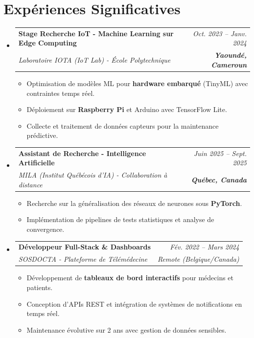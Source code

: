 \documentclass[a4paper,11pt]{article}
\makeatletter
\newcommand{\resumeSubheading}[4]{
  \vspace{-1pt}\item
    \begin{tabular*}{0.97\textwidth}[t]{l@{\extracolsep{\fill}}r}
      \textbf{#1} & \textit{\small #2} \\
      \textit{\small #3} & \textit{\small #4} \\
    \end{tabular*}\vspace{-5pt}
}
\makeatother
\begin{document}
\section{Expériences Significatives}
\begin{itemize}[leftmargin=*, label={}]

    \resumeSubheading
      {Stage Recherche IoT - Machine Learning sur Edge Computing}{Oct. 2023 -- Janv. 2024}
      {Laboratoire IOTA (IoT Lab) - École Polytechnique}{\textbf{Yaoundé, Cameroun}}
      \begin{itemize}[leftmargin=0.4cm, nosep, label=\tiny$\bullet$]
        \item \small{Optimisation de modèles ML pour \textbf{hardware embarqué} (TinyML) avec contraintes temps réel.}
        \item \small{Déploiement sur \textbf{Raspberry Pi} et Arduino avec TensorFlow Lite.}
        \item \small{Collecte et traitement de données capteurs pour la maintenance prédictive.}
      \end{itemize}
    \vspace{2pt}

    \resumeSubheading
      {Assistant de Recherche - Intelligence Artificielle}{Juin 2025 -- Sept. 2025}
      {MILA (Institut Québécois d'IA) - Collaboration à distance}{\textbf{Québec, Canada}}
      \begin{itemize}[leftmargin=0.4cm, nosep, label=\tiny$\bullet$]
        \item \small{Recherche sur la généralisation des réseaux de neurones sous \textbf{PyTorch}.}
        \item \small{Implémentation de pipelines de tests statistiques et analyse de convergence.}
      \end{itemize}
    \vspace{2pt}

    \resumeSubheading
      {Développeur Full-Stack \& Dashboards}{Fév. 2022 -- Mars 2024}
      {SOSDOCTA - Plateforme de Télémédecine}{Remote (Belgique/Canada)}
      \begin{itemize}[leftmargin=0.4cm, nosep, label=\tiny$\bullet$]
        \item \small{Développement de \textbf{tableaux de bord interactifs} pour médecins et patients.}
        \item \small{Conception d'APIs REST et intégration de systèmes de notifications en temps réel.}
        \item \small{Maintenance évolutive sur 2 ans avec gestion de données sensibles.}
      \end{itemize}
\end{itemize}
\end{document}
